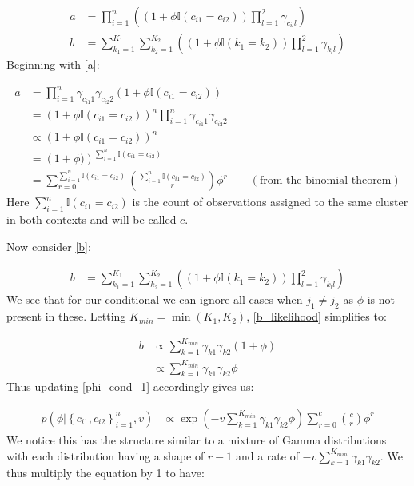 \documentclass[11pt]{article} %
\begin{document}
\begin{align}
a &=  \prod_{i = 1}^n \left(\left(1 + \phi \mathbb{I}(c_{i1} = c_{i2})\right) \prod_{l = 1}^{2}\gamma_{c_{il}l}\right)  \label{a} \\
b &=  \sum_{k_1=1}^{K_1}\sum_{k_2=1}^{K_2}\left(\left(1 + \phi\mathbb{I}(k_1 = k_2)\right) \prod_{l=1}^2\gamma_{k_ll}\right) \label{b}
\end{align}
Beginning with \eqref{a}:

\begin{align}
a &= \prod_{i = 1}^n \gamma_{c_{i1}1} \gamma_{c_{i2}2}  \left(1 + \phi \mathbb{I}(c_{i1} = c_{i2})\right) \\
 &= \left(1 + \phi \mathbb{I}(c_{i1} = c_{i2})\right)^n \prod_{i = 1}^n \gamma_{c_{i1}1} \gamma_{c_{i2}2} \\
 &\propto  \left(1 + \phi \mathbb{I}(c_{i1} = c_{i2})\right)^n \\
 &=  \left(1 + \phi)\right)^{\sum_{i=1}^n  \mathbb{I}(c_{i1} = c_{i2})} \\
 &= \sum_{r=0}^{\sum_{i=1}^n  \mathbb{I}(c_{i1} = c_{i2})} \binom{\sum_{i=1}^n  \mathbb{I}(c_{i1} = c_{i2})}{r} \phi^r \qquad (\text{from the binomial theorem})
\end{align}
Here $\sum_{i=1}^n  \mathbb{I}(c_{i1} = c_{i2})$ is the count of observations assigned to the same cluster in both contexts and will be called $c$.

Now consider \eqref{b}:

\begin{align} \label{b_likelihood}
b &=  \sum_{k_1=1}^{K_1}\sum_{k_2=1}^{K_2}\left(\left(1 + \phi\mathbb{I}(k_1 = k_2)\right) \prod_{l=1}^2\gamma_{k_ll}\right)
\end{align}
We see that for our conditional we can ignore all cases when $j_1 \neq j_2$ as $\phi$ is not present in these. Letting $K_{min} = \min(K_1,K_2)$, \eqref{b_likelihood} simplifies to:

\begin{align}
b &\propto \sum_{k=1}^{K_{min}}\gamma_{k1} \gamma_{k2} \left(1 + \phi\right) \\
&\propto \sum_{k=1}^{K_{min}} \gamma_{k1} \gamma_{k2} \phi
\end{align}
Thus updating \eqref{phi_cond_1} accordingly gives us:

\begin{align}
p(\phi | \left\{c_{i1}, c_{i2}\right\}_{i=1}^n, v) &\propto \exp\left(-v \sum_{k=1}^{K_{min}}\gamma_{k1} \gamma_{k2}\phi\right)  \sum_{r=0}^c \binom{c}{r} \phi^r
\end{align}
We notice this has the structure similar to a mixture of Gamma distributions with each distribution having a shape of $r-1$ and a rate of $-v\sum_{k=1}^{K_{min}}\gamma_{k1} \gamma_{k2}$. We thus multiply the equation by 1 to have:
\end{document}
